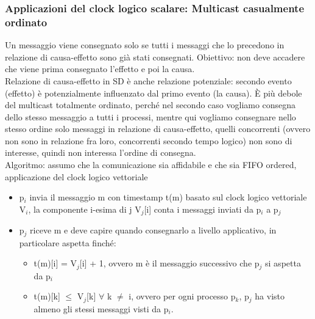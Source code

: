 \documentclass{article}
\begin{document}
\subsubsection{Applicazioni del clock logico scalare: Multicast casualmente ordinato}
Un messaggio viene consegnato solo se tutti i messaggi che lo precedono in relazione di causa-effetto sono già stati consegnati. Obiettivo: non deve accadere che viene prima consegnato l'effetto e poi la causa.\\ Relazione di causa-effetto in SD è anche relazione potenziale: secondo evento (effetto) è potenzialmente influenzato dal primo evento (la causa). È più debole del multicast totalmente ordinato, perché nel secondo caso vogliamo consegna dello stesso messaggio a tutti i processi, mentre qui vogliamo consegnare nello stesso ordine solo messaggi in relazione di causa-effetto, quelli concorrenti (ovvero non sono in relazione fra loro, concorrenti secondo tempo logico) non sono di interesse, quindi non interessa l'ordine di consegna.\\ Algoritmo: assumo che la comunicazione sia affidabile e che sia FIFO ordered, applicazione del clock logico vettoriale
\begin{itemize}
\item p$_i$ invia il messaggio m con timestamp t(m) basato sul clock logico vettoriale V$_i$, la componente i-esima di j V$_j$[i] conta i messaggi inviati da p$_i$ a p$_j$
\item p$_j$ riceve m e deve capire quando consegnarlo a livello applicativo, in particolare aspetta finché:
\begin{itemize}
\item t(m)[i] = V$_j$[i] + 1, ovvero m è il messaggio successivo che p$_j$ si aspetta da p$_i$
\item t(m)[k] $\leq$ V$_j$[k] $\forall$ k $\neq$ i, ovvero per ogni processo p$_k$, p$_j$ ha visto almeno gli stessi messaggi visti da p$_i$.
\end{itemize}
\end{itemize}
\end{document}
